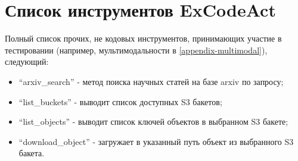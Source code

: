 \section{Список инструментов ExCodeAct}\label{appendix-tools:sec2}

Полный список прочих, не кодовых инструментов, принимающих участие в тестировании
(например, мультимодальности в \ref{appendix-multimodal}), следующий:
\begin{itemize}
	\item ``arxiv\_search'' - метод поиска научных статей на базе arxiv по запросу;
	\item ``list\_buckets'' - выводит список доступных S3 бакетов;
	\item ``list\_objects'' - выводит список ключей объектов в выбранном S3 бакете;
	\item ``download\_object'' - загружает в указанный путь объект из выбранного S3 бакета. 
\end{itemize}
